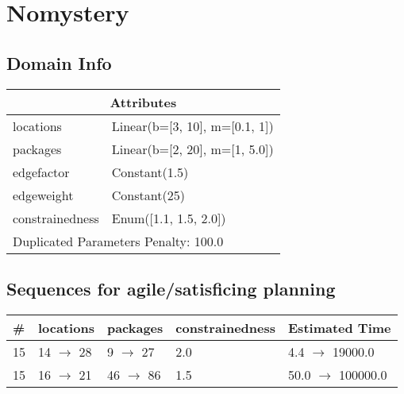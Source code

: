 \documentclass{article}
\begin{document}
                            \newpage \section{Nomystery}
                    \subsection*{Domain Info}

                    \begin{center}
                    \begin{tabular}{@{}p{}p{}@{}}
                    \multicolumn{2}{c}{\bf \large Attributes}\\\midrule
                    locations & Linear(b=[3, 10], m=[0.1, 1])\\
packages & Linear(b=[2, 20], m=[1, 5.0])\\
edgefactor & Constant(1.5)\\
edgeweight & Constant(25)\\
constrainedness & Enum([1.1, 1.5, 2.0])
                    
                     \\\midrule
                    \multicolumn{2}{l}{Duplicated Parameters Penalty: 100.0}
                    \end{tabular}
                    \end{center}
                
                         \subsection*{Sequences for agile/satisficing planning}

                        \begin{center}
                        \begin{tabular}{@{}l|l|l|l|l@{}}
                        \# & locations & packages & constrainedness & Estimated Time\\\midrule
                        15&14 $\rightarrow$ 28&9 $\rightarrow$ 27&2.0&4.4 $\rightarrow$ 19000.0\\
15&16 $\rightarrow$ 21&46 $\rightarrow$ 86&1.5&50.0 $\rightarrow$ 100000.0
                        \end{tabular}
                        \end{center}
                    
\end{document}
